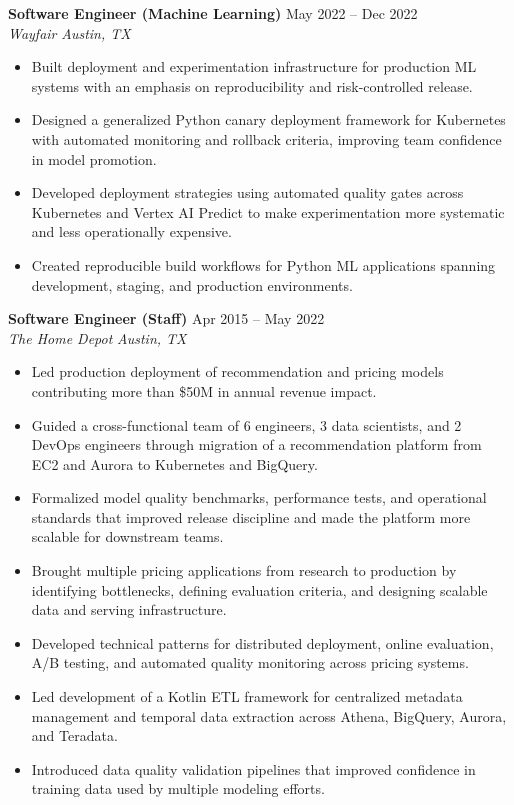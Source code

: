 \documentclass[10pt,letterpaper]{article}
\newcommand{\roleheading}[4]{%
  \textbf{#1} \hfill #2\\
  \textit{#3} \hfill \textit{#4}\par
  \vspace{0.15em}
}
\begin{document}
\roleheading{Software Engineer (Machine Learning)}{May 2022 -- Dec 2022}{Wayfair}{Austin, TX}
\begin{itemize}
  \item Built deployment and experimentation infrastructure for production ML systems with an emphasis on reproducibility and risk-controlled release.
  \item Designed a generalized Python canary deployment framework for Kubernetes with automated monitoring and rollback criteria, improving team confidence in model promotion.
  \item Developed deployment strategies using automated quality gates across Kubernetes and Vertex AI Predict to make experimentation more systematic and less operationally expensive.
  \item Created reproducible build workflows for Python ML applications spanning development, staging, and production environments.
\end{itemize}

\roleheading{Software Engineer (Staff)}{Apr 2015 -- May 2022}{The Home Depot}{Austin, TX}
\begin{itemize}
  \item Led production deployment of recommendation and pricing models contributing more than \$50M in annual revenue impact.
  \item Guided a cross-functional team of 6 engineers, 3 data scientists, and 2 DevOps engineers through migration of a recommendation platform from EC2 and Aurora to Kubernetes and BigQuery.
  \item Formalized model quality benchmarks, performance tests, and operational standards that improved release discipline and made the platform more scalable for downstream teams.
  \item Brought multiple pricing applications from research to production by identifying bottlenecks, defining evaluation criteria, and designing scalable data and serving infrastructure.
  \item Developed technical patterns for distributed deployment, online evaluation, A/B testing, and automated quality monitoring across pricing systems.
  \item Led development of a Kotlin ETL framework for centralized metadata management and temporal data extraction across Athena, BigQuery, Aurora, and Teradata.
  \item Introduced data quality validation pipelines that improved confidence in training data used by multiple modeling efforts.
\end{itemize}
\end{document}
